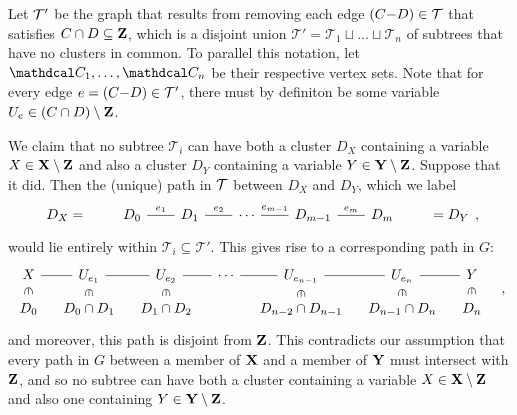 \begin{subappendices}
\begin{lproof}
    Let $\cal T'$ be the graph that results from removing each edge $(C{-}D) \in \cal T$ that satisfies $C \cap D \subseteq \mathbf Z$, which is a disjoint union  $\mathcal T' = \mathcal T_1 \sqcup \ldots \sqcup \mathcal T_n$ of subtrees that have no clusters in common.
    To parallel this notation, let $\C_1, \ldots, \C_n$ be their respective vertex sets.
    Note that for every edge $e=(C{-}D)\in \cal T'$, there must by definiton be some variable $U_e \in (C \cap D) \setminus \mathbf Z$.

    We claim that no subtree $\mathcal T_i$ can have both a cluster $D_X$ containing a variable $X \in \mathbf X \setminus \mathbf Z$ and also a cluster $D_Y$ containing a variable $Y \in \mathbf Y \setminus \mathbf Z$.
    Suppose that it did.
    Then the (unique) path in $\cal T$ between $D_X$ and $D_Y$, which we label
    \[
    \begin{tikzcd}[column sep=2em]
        D_X=
        &D_0 \ar[r,-,"e_1"]&
        D_1 \ar[r,-,"e_2"]&
          \cdots
        \ar[r,-,"e_{m-1}"]& D_{m-1}
        \ar[r,-,"e_m"] & D_m&
        =D_Y
    \end{tikzcd},
    \]
    would lie entirely within $\mathcal T_i \subseteq \mathcal T'$. This gives rise to
    a corresponding path in $G$:
    \[\begin{tikzcd}[column sep=1em,row sep=1.5ex]
        X \ar[r,-] \ar[d,sloped,phantom,"\in"]
        & U_{e_1}\ar[r,-] \ar[d,sloped,phantom,"\in"]
        & U_{e_2}\ar[r,-] \ar[d,sloped,phantom,"\in"]
           &\cdots\ar[r,-]
        & U_{e_{n{-}1}} \ar[r,-] \ar[d,sloped,phantom,"\in"]
        & U_{e_n}\ar[r,-] \ar[d,sloped,phantom,"\in"]
        & Y \ar[d,sloped,phantom,"\in"]
            \\
        D_0
        & D_0 \cap D_1
        & D_1 \cap D_2
        &
        & D_{n{-}2} \cap D_{n{-}1}
        & D_{n{-}1} \cap D_n
        & D_n
    \end{tikzcd}\quad,\]
    and moreover, this path is disjoint from $\mathbf Z$.
    This contradicts our assumption that every path in $G$ between a member of $\mathbf X$ and a member of $\mathbf Y$ must intersect with $\mathbf Z$, and so no subtree can have both a cluster containing a variable $X \in \mathbf X \setminus \mathbf Z$ and also one containing $Y \in \mathbf Y \setminus \mathbf Z$.


\end{lproof}
\end{subappendices}
